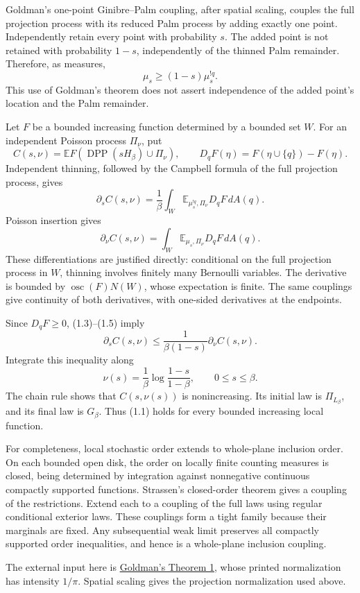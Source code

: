 \documentclass[11pt,a4paper]{article}
\theoremstyle{definition}
\theoremstyle{remark}
\numberwithin{equation}{section}
\begin{document}
Goldman's one-point Ginibre--Palm coupling, after spatial scaling, couples the full projection process with its reduced Palm process by adding exactly one point. Independently retain every point with probability \(s\). The added point is not retained with probability \(1-s\), independently of the thinned Palm remainder. Therefore, as measures, \[
\mu_s\ge(1-s)\mu_s^{!q}.
\tag{1.3}
\] This use of Goldman's theorem does not assert independence of the added point's location and the Palm remainder.

Let \(F\) be a bounded increasing function determined by a bounded set \(W\). For an independent Poisson process \(\Pi_\nu\), put \[
C(s,\nu)=\mathbb EF(\operatorname{DPP}(sH_\beta)\cup\Pi_\nu),
\qquad D_qF(\eta)=F(\eta\cup\{q\})-F(\eta).
\] Independent thinning, followed by the Campbell formula of the full projection process, gives \[
\partial_s C(s,\nu)
 =\frac1\beta\int_W
      \mathbb E_{\mu_s^{!q},\Pi_\nu}D_qF\,dA(q).
\tag{1.4}
\] Poisson insertion gives \[
\partial_\nu C(s,\nu)
 =\int_W\mathbb E_{\mu_s,\Pi_\nu}D_qF\,dA(q).
\tag{1.5}
\] These differentiations are justified directly: conditional on the full projection process in \(W\), thinning involves finitely many Bernoulli variables. The derivative is bounded by \(\operatorname{osc}(F)N(W)\), whose expectation is finite. The same couplings give continuity of both derivatives, with one-sided derivatives at the endpoints.

Since \(D_qF\ge0\), (1.3)--(1.5) imply \[
\partial_s C(s,\nu)
\le\frac1{\beta(1-s)}\partial_\nu C(s,\nu).
\tag{1.6}
\] Integrate this inequality along \[
\nu(s)=\frac1\beta\log\frac{1-s}{1-\beta},
\qquad 0\le s\le\beta.
\] The chain rule shows that \(C(s,\nu(s))\) is nonincreasing. Its initial law is \(\Pi_{L_\beta}\), and its final law is \(G_\beta\). Thus (1.1) holds for every bounded increasing local function.

For completeness, local stochastic order extends to whole-plane inclusion order. On each bounded open disk, the order on locally finite counting measures is closed, being determined by integration against nonnegative continuous compactly supported functions. Strassen's closed-order theorem gives a coupling of the restrictions. Extend each to a coupling of the full laws using regular conditional exterior laws. These couplings form a tight family because their marginals are fixed. Any subsequential weak limit preserves all compactly supported order inequalities, and hence is a whole-plane inclusion coupling.

The external input here is \href{https://arxiv.org/pdf/math/0610243}{Goldman's Theorem 1}, whose printed normalization has intensity \(1/\pi\). Spatial scaling gives the projection normalization used above.
\end{document}
